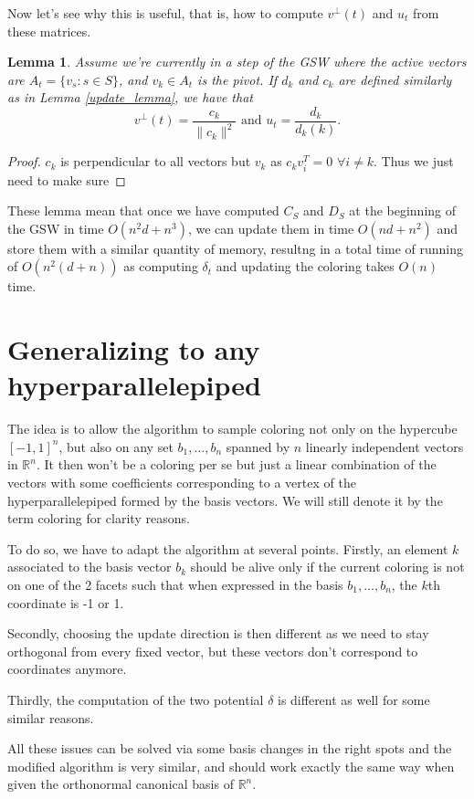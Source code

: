 \documentclass[12pt]{article}
\newtheorem{lemma}[theorem]{Lemma}
\begin{document}
Now let's see why this is useful, that is, how to compute $v^\perp(t)$ and $u_t$ from these matrices.
\begin{lemma}
Assume we're currently in a step of the GSW where the active vectors are $A_t=\{v_s:s\in S\}$, and $v_k\in A_t$ is the pivot. If $d_k$ and $c_k$ are defined similarly as in Lemma \ref{update_lemma}, we have that $$v^\perp(t)=\frac{c_k}{\|c_k\|^2}\textrm{ and }u_t=\frac{d_k}{d_k(k)}.$$
\end{lemma}
\begin{proof}
$c_k$ is perpendicular to all vectors but $v_k$ as $c_kv_i^T=0$ $\forall i\not=k$. Thus we just need to make sure
\end{proof}
These lemma mean that once we have computed $C_S$ and $D_S$ at the beginning of the GSW in time $O(n^2d+n^3)$, we can update them in time $O(nd+n^2)$ and store them with a similar quantity of memory, resultng in a total time of running of $O(n^2(d+n))$ as computing $\delta_t$ and updating the coloring takes $O(n)$ time.


\section{Generalizing to any hyperparallelepiped}
The idea is to allow the algorithm to sample coloring not only on the hypercube $[-1,1]^n$, but also on any set $b_1,\dots, b_n$ spanned by $n$ linearly independent vectors in $\mathbb{R}^n$. It then won't be a coloring per se but just a linear combination of the vectors with some coefficients corresponding to a vertex of the hyperparallelepiped formed by the basis vectors. We will still denote it by the term coloring for clarity reasons.

To do so, we have to adapt the algorithm at several points. Firstly, an element $k$ associated to the basis vector $b_k$ should be alive only if the current coloring is not on one of the 2 facets such that when expressed in the basis $b_1,\dots,b_n$, the $k$th coordinate is -1 or 1. 

Secondly, choosing the update direction is then different as we need to stay orthogonal from every fixed vector, but these vectors don't correspond to coordinates anymore.

Thirdly, the computation of the two potential $\delta$ is different as well for some similar reasons.

All these issues can be solved via some basis changes in the right spots and the modified algorithm is very similar, and should work exactly the same way when given the orthonormal canonical basis of $\mathbb{R}^n$.
\end{document}

